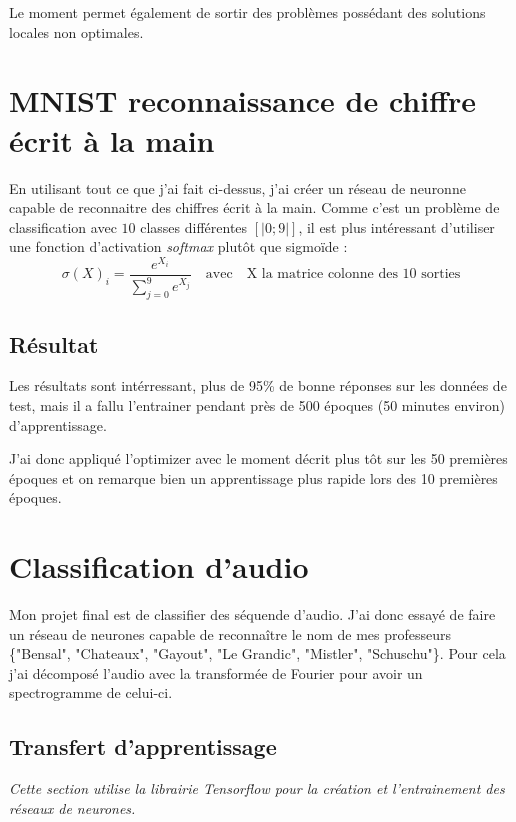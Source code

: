 \documentclass[12pt,a4paper, french]{article}
\begin{document}
Le moment permet également de sortir des problèmes possédant des solutions locales non optimales.


\section{MNIST reconnaissance de chiffre écrit à la main}
En utilisant tout ce que j'ai fait ci-dessus, j'ai créer un réseau de neuronne capable de reconnaitre des chiffres écrit à la main. Comme c'est un problème de classification avec $10$ classes différentes $[|0; 9|]$, il est plus intéressant d'utiliser une fonction d'activation \textit{softmax} plutôt que sigmoïde :  
\begin{equation}
	\sigma(X)_i = \frac{e^{X_i}}{\sum_{j=0}^{9}{e^{X_j}}} 
	\quad \textrm{avec} \quad
	\textrm{X la matrice colonne des 10 sorties}
\end{equation}

\subsection{Résultat}
Les résultats sont intérressant, plus de 95\% de bonne réponses sur les données de test, mais il a fallu l'entrainer pendant près de 500 époques (50 minutes environ) d'apprentissage.

J'ai donc appliqué l'optimizer avec le moment décrit plus tôt sur les 50 premières époques et on remarque bien un apprentissage plus rapide lors des 10 premières époques.


\section{Classification d'audio }
Mon projet final est de classifier des séquende d'audio. J'ai donc essayé de faire un réseau de neurones capable de reconnaître le nom de mes professeurs \{"Bensal", "Chateaux", "Gayout", "Le Grandic", "Mistler", "Schuschu"\}. Pour cela j'ai décomposé l'audio avec la transformée de Fourier pour avoir un spectrogramme de celui-ci.


\subsection{Transfert d'apprentissage}
\textit{Cette section utilise la librairie Tensorflow pour la création et l'entrainement des réseaux de neurones.}  
  
\end{document}
